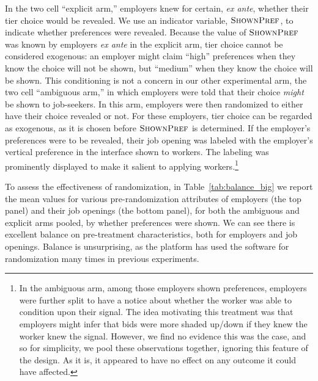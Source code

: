 \documentclass[12pt]{article}
\begin{document}
In the two cell ``explicit arm,'' employers knew for certain, \emph{ex ante}, whether their tier choice would be revealed.
We use an indicator variable, $\textsc{ShownPref}$, to indicate whether preferences were revealed. 
Because the value of $\textsc{ShownPref}$ was known by employers \emph{ex ante} in the explicit arm, tier choice cannot be considered exogenous: 
an employer might claim ``high'' preferences when they know the choice will not be shown, but ``medium'' when they know the choice will be shown.
This conditioning is not a concern in our other experimental arm, the two cell  ``ambiguous arm,'' in which employers were told that their choice \emph{might} be shown to job-seekers.
In this arm, employers were then randomized to either have their choice revealed or not. 
For these employers, tier choice can be regarded as exogenous, as it is chosen before $\textsc{ShownPref}$ is determined.
If the employer's preferences were to be revealed, their job opening was labeled with the employer's vertical preference in the interface shown to workers.
The labeling was prominently displayed to make it salient to applying workers.\footnote{
  In the ambiguous arm, among those employers shown preferences, employers were further split to have a notice about whether the worker was able to condition upon their signal.
  The idea motivating this treatment was that employers might infer that bids were more shaded up/down if they knew the worker knew the signal.
  However, we find no evidence this was the case, and so for simplicity, we pool these observations together, ignoring this feature of the design.
  As it is, it appeared to have no effect on any outcome it could have affected. 
}

To assess the effectiveness of randomization, in Table~\ref{tab:balance_big} we report the mean values for various pre-randomization attributes of employers (the top panel) and their job openings (the bottom panel), for both the ambiguous and explicit arms pooled, by whether preferences were shown.
We can see there is excellent balance on pre-treatment characteristics, both for employers and job openings.
Balance is unsurprising, as the platform has used the software for randomization many times in previous experiments.
\end{document}
